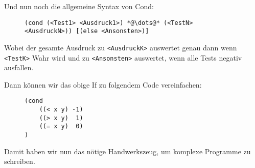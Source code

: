 	Und nun noch die allgemeine Syntax von Cond:
	\begin{figure}[H]
		\centering
		\lstinline[language = Racket, style = base]|(cond (<Test1> <Ausdruck1>) *@\dots@* (<TestN> <AusdruckN>)) [(else <Ansonsten>)]|
	\end{figure}
	Wobei der gesamte Ausdruck zu \texttt{<AusdruckK>} auswertet genau dann wenn \texttt{<TestK>} Wahr wird und zu \texttt{<Ansonsten>} auswertet, wenn alle Tests negativ ausfallen.
	
	Dann können wir das obige If zu folgendem Code vereinfachen:
	\begin{figure}[H]
		\centering
		\begin{lstlisting}[language = Racket]
(cond
	((< x y) -1)
	((> x y)  1)
	((= x y)  0)
)
\end{lstlisting}
	\end{figure}

	Damit haben wir nun das nötige Handwerkszeug, um komplexe Programme zu schreiben.
